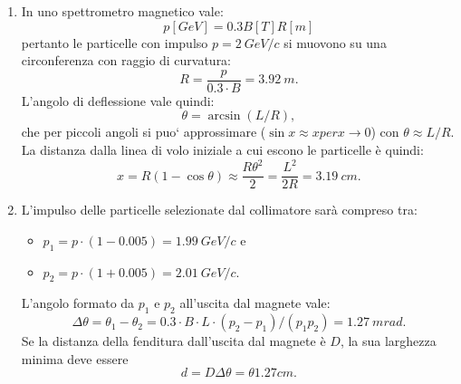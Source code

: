 \begin{Answer}
  \begin{enumerate}
  \item In uno spettrometro magnetico vale:
    \[
    p[GeV] = 0.3B[T] R[m]
    \]
    pertanto le particelle con impulso $p = \SI{2}{GeV/c}$ si muovono su una circonferenza con raggio di curvatura:
    \[
    R = \frac{p}{0.3 \cdot B} = \SI{3.92}{m}.
    \]
    L’angolo di deflessione vale quindi:
    \[
    \theta = \arcsin (L/R),
    \]
    che per piccoli angoli si puo` approssimare ($\sin x \approx x per x \to 0$) con $\theta \approx L/R$. La distanza dalla linea di volo iniziale a cui escono le particelle \`e quindi:
    \[
    x = R(1-\cos\theta) \approx \frac{R\theta^2}{2} = \frac{L^2}{2R} = \SI{3.19}{cm}.
    \]
    
  \item L’impulso delle particelle selezionate dal collimatore sar\`a compreso tra:
    \begin{itemize}
    \item $p_1 = p\cdot(1-0.005) = \SI{1.99}{GeV/c}$ e
    \item $p_2 = p\cdot(1+0.005) = \SI{2.01}{GeV/c}$.
    \end{itemize}
    L’angolo formato da $p_1$ e $p_2$ all’uscita dal magnete vale:
    \[
    \Delta \theta = \theta_1 - \theta_2 = 0.3 \cdot B\cdot L\cdot (p_2 - p_1)/(p_1p_2) = \SI{1.27}{mrad}.
    \]
    Se la distanza della fenditura dall’uscita dal magnete \`e $D$, la sua larghezza minima deve essere
    \[
    d = D \Delta\theta = \theta{1.27}{cm}.
    \]


\end{enumerate}
\end{Answer}

